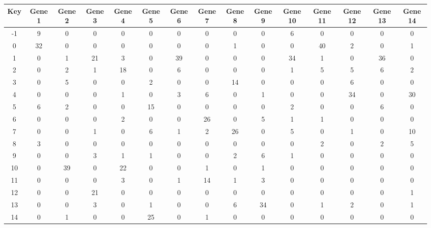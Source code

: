 \begin{tabular}{|c|c|c|c|c|c|c|c|c|c|c|c|c|c|c|}
\hline
Key & Gene 1 & Gene 2 & Gene 3 & Gene 4 & Gene 5 & Gene 6 & Gene 7 & Gene 8 & Gene 9 & Gene 10 & Gene 11 & Gene 12 & Gene 13 & Gene 14 \\
\hline
-1 & 9 & 0 & 0 & 0 & 0 & 0 & 0 & 0 & 0 & 6 & 0 & 0 & 0 & 0 \\
0 & 32 & 0 & 0 & 0 & 0 & 0 & 0 & 1 & 0 & 0 & 40 & 2 & 0 & 1 \\
1 & 0 & 1 & 21 & 3 & 0 & 39 & 0 & 0 & 0 & 34 & 1 & 0 & 36 & 0 \\
2 & 0 & 2 & 1 & 18 & 0 & 6 & 0 & 0 & 0 & 1 & 5 & 5 & 6 & 2 \\
3 & 0 & 5 & 0 & 0 & 2 & 0 & 0 & 14 & 0 & 0 & 0 & 6 & 0 & 0 \\
4 & 0 & 0 & 0 & 1 & 0 & 3 & 6 & 0 & 1 & 0 & 0 & 34 & 0 & 30 \\
5 & 6 & 2 & 0 & 0 & 15 & 0 & 0 & 0 & 0 & 2 & 0 & 0 & 6 & 0 \\
6 & 0 & 0 & 0 & 2 & 0 & 0 & 26 & 0 & 5 & 1 & 1 & 0 & 0 & 0 \\
7 & 0 & 0 & 1 & 0 & 6 & 1 & 2 & 26 & 0 & 5 & 0 & 1 & 0 & 10 \\
8 & 3 & 0 & 0 & 0 & 0 & 0 & 0 & 0 & 0 & 0 & 2 & 0 & 2 & 5 \\
9 & 0 & 0 & 3 & 1 & 1 & 0 & 0 & 2 & 6 & 1 & 0 & 0 & 0 & 0 \\
10 & 0 & 39 & 0 & 22 & 0 & 0 & 1 & 0 & 1 & 0 & 0 & 0 & 0 & 0 \\
11 & 0 & 0 & 0 & 3 & 0 & 1 & 14 & 1 & 3 & 0 & 0 & 0 & 0 & 0 \\
12 & 0 & 0 & 21 & 0 & 0 & 0 & 0 & 0 & 0 & 0 & 0 & 0 & 0 & 1 \\
13 & 0 & 0 & 3 & 0 & 1 & 0 & 0 & 6 & 34 & 0 & 1 & 2 & 0 & 1 \\
14 & 0 & 1 & 0 & 0 & 25 & 0 & 1 & 0 & 0 & 0 & 0 & 0 & 0 & 0 \\
\hline
\end{tabular}